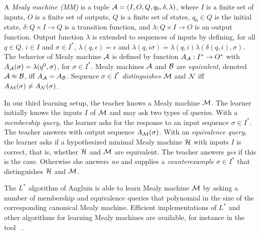 A \emph{Mealy machine (MM)} is a tuple ${\cal A} = (I, O, Q, q_0, \delta, \lambda)$, where
$I$ is a finite set of inputs,
$O$ is a finite set of outputs,
$Q$ is a finite set of states,
$q_0 \in Q$ is the initial state,
$\delta: Q \times I \rightarrow Q$ is a transition function, and
$\lambda: Q \times I \rightarrow O$ is an output function.
%
Output function $\lambda$ is extended to sequences of inputs by defining,
for all $q \in Q$, $i \in I$ and $\sigma \in I^{\ast}$,
$\lambda(q, \epsilon) = \epsilon$ and $\lambda(q, i \sigma) = \lambda(q, i) \lambda(\delta(q, i), \sigma)$.
%
The behavior of Mealy machine ${\cal A}$ is defined by function $A_{\cal A} : I^{\ast} \rightarrow O^{\ast}$ with
$A_{\cal A}(\sigma) = \lambda (q^0, \sigma)$, for  $\sigma \in I^{\ast}$.
Mealy machines ${\cal A}$ and ${\cal B}$ are \emph{equivalent}, denoted ${\cal A} \approx {\cal B}$, iff $A_{{\cal A}} = A_{{\cal B}}$.
Sequence $\sigma \in I^{\ast}$ \emph{distinguishes}
${\cal M}$ and ${\cal N}$ iff $A_{{\cal M}}(\sigma) \neq A_{{\cal N}}(\sigma)$.

In our third learning setup, the teacher knows a Mealy machine ${\cal M}$. 
The learner initially knows the inputs $I$ of ${\cal M}$ and may ask two types of queries.
With a \emph{membership query}, the learner asks for the response to an input sequence $\sigma \in I^{\ast}$.
The teacher answers with output sequence $A_{{\cal M}}(\sigma)$.
With an \emph{equivalence query}, the learner asks if a hypothesized minimal Mealy machine ${\cal H}$ with
inputs $I$ is correct, that is, whether ${\cal H}$ and ${\cal M}$ are equivalent.
The teacher answers \emph{yes} if this is the case. Otherwise she answers \emph{no} and supplies a
\emph{counterexample} $\sigma \in I^{\ast}$ that distinguishes ${\cal H}$ and ${\cal M}$.

The $L^{\ast}$ algorithm of Angluin \cite{Ang87} is able to learn Mealy machine ${\cal M}$ by asking a
number of membership and equivalence queries that polynomial in the size of the corresponding canonical Mealy machine.
Efficient implementations of $L^{\ast}$ and other algorithms for learning Mealy machines are available,
for instance in the tool \learnlib\ \cite{Nie03,RSBM09,MertenSHM11}.

